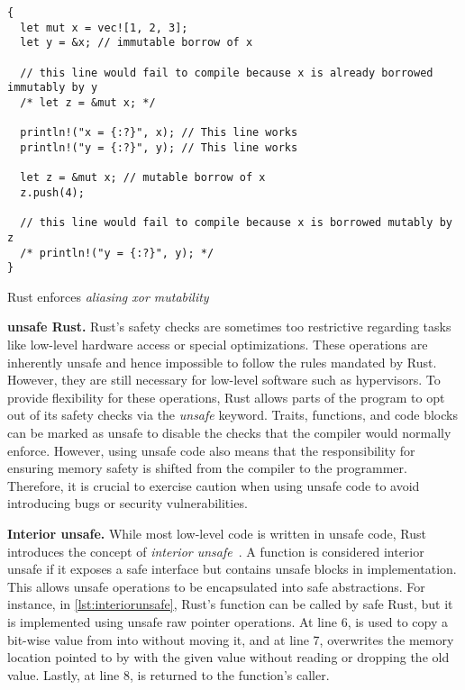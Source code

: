 \begin{listing}[hbtp]
    \begin{verbatim}
{
  let mut x = vec![1, 2, 3];
  let y = &x; // immutable borrow of x

  // this line would fail to compile because x is already borrowed immutably by y
  /* let z = &mut x; */

  println!("x = {:?}", x); // This line works
  println!("y = {:?}", y); // This line works

  let z = &mut x; // mutable borrow of x
  z.push(4);

  // this line would fail to compile because x is borrowed mutably by z
  /* println!("y = {:?}", y); */
}
    \end{verbatim}
    \caption{Rust enforces \textit{aliasing xor mutability}}
    \label{lst:borrowingrule}
    \vspace{-0.2cm}
\end{listing}

\textbf{unsafe Rust.}
Rust's safety checks are sometimes too restrictive regarding tasks like
low-level hardware access or special optimizations. These operations are
inherently unsafe and hence impossible to follow the rules mandated by Rust.
However, they are still necessary for low-level software such as
hypervisors. To provide flexibility for these operations, Rust allows
parts of the program to opt out of its safety checks via the \textit{unsafe}
keyword. Traits, functions, and code blocks can be marked as unsafe to disable
the checks that the compiler would normally enforce. However, using unsafe code
also means that the responsibility for ensuring memory safety is shifted from
the compiler to the programmer. Therefore, it is crucial to exercise
caution when using unsafe code to avoid introducing bugs or security
vulnerabilities.

\textbf{Interior unsafe.}
While most low-level code is written in unsafe code, Rust introduces
the concept of \textit{interior unsafe}~\cite{ruststudy}. A function is considered
interior unsafe if it exposes a safe interface but contains unsafe blocks
in implementation. This allows unsafe operations to be encapsulated
into safe abstractions. For instance, in
\autoref{lst:interiorunsafe}, Rust's  function can be
called by safe Rust, but it is implemented using unsafe raw pointer operations.
At line 6,  is used to copy a bit-wise value from 
into  without moving it, and at line 7,  overwrites
the memory location pointed to by  with the given value 
without reading or dropping the old value. Lastly, at line 8,  is
returned to the function's caller.

